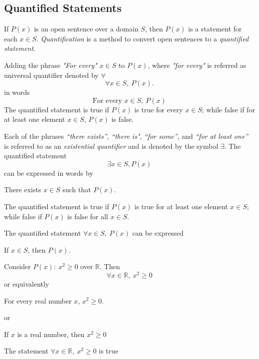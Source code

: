 \subsection{Quantified Statements}
If $P(x)$ is an open sentence over a domain $S$, then $P(x)$ 
is a statement for each $x \in S$. \emph{Quantification} is a method 
to convert open sentences to a \emph{quantified statement}.
\begin{defi}
    Adding the phrase \textit{"For every"} $x \in S$ to $P(x)$, where 
    \textit{"for every"} is referred as universal quantifier 
    denoted by $\forall$
    \begin{equation*}
        \forall x \in S,\: P(x).
    \end{equation*}
    in words
    \begin{equation*}
         \text{For every } x \in S,\: P(x)
    \end{equation*}
    The quantified statement is true if $P(x)$ is true for 
    every $x\in S$; while false if for at least one element
     $x\in S$, $P(x)$ is false.
\end{defi}
\begin{defi}
    Each of the phrases \textit{“there exists”}, \textit{“there is"}, 
    \textit{“for some”}, and \textit{“for at least one”} is
    referred to as an \emph{existential quantifier} and is denoted by 
    the symbol $\exists$. The quantified statement
    \begin{equation*}
         \exists x \in S, P(x)
    \end{equation*}
    can be expressed in words by
    \begin{center}
         There exists $x \in S$ such that $P(x)$.
    \end{center}
    The quantified statement is true if $P(x)$ 
    is true for at least one element $x \in S$; while  false 
    if $P(x)$ is false for all $x \in S$.
\end{defi}
\begin{eg}
    The quantified statement $\forall x \in S,\: P(x)$ can be expressed
    \begin{center}
         If $x \in S$, then $P(x)$.
    \end{center}
\end{eg}
\begin{eg}
    Consider $P(x):\: x^2 \geq 0$ over $\mathbb{R}$. Then
    \begin{equation*}
        \forall x \in \mathbb{R},\: x^2 \geq 0
    \end{equation*}
    or equivalently
    \begin{center}
        For every real number $x$, $x^2 \geq 0$.
    \end{center}
    or 
    \begin{center}
        If $x$ is a real number, then $x^2 \geq 0$
    \end{center}
    The statement $ \forall x \in \mathbb{R},\: x^2 \geq 0$ is true
\end{eg}
